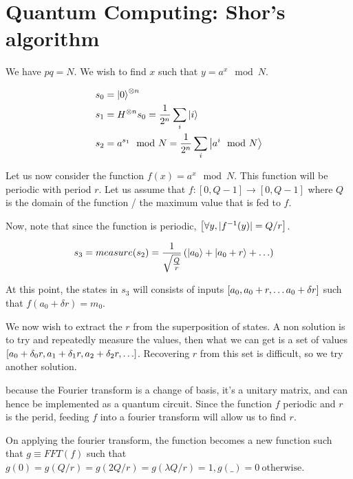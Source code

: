 \chapter{Quantum Computing: Shor's algorithm}

We have $pq = N$. We wish to find $x$ such that $y = a^x \mod N$.

\begin{align*}
    &s_0 = \ket 0^{\otimes n} \\
    &s_1 = H^{\otimes n} s_0  = \frac{1}{2^n} \sum_i \ket{i} \\
    &s_2 = a^{s_1} \mod N = \frac{1}{2^n} \sum_i \ket{a^i \mod N} \\
\end{align*}

Let us now consider the function $f(x) = a^x \mod N$. This function will
be periodic with period $r$. Let us assume that $f: [0, Q-1] \to [0, Q-1]$ where
$Q$ is the domain of the function / the maximum value that is fed to $f$.

Now, note that since the function is periodic, $\left[\forall y, |f^{-1}(y)| = Q/r\right]$.

\begin{align*}
    &s_3 = measure(s_2) = \frac{1}{\sqrt\frac{Q}{r}} \l(\ket{a_0} + \ket {a_0 + r} + \dots \r)
\end{align*}

At this point, the states in $s_3$ will consists of inputs $\left[ a_0, a_0 + r, \dots a_0 + \delta r \right]$
such that $f(a_0 + \delta r) = m_0$.

We now wish to extract the $r$ from the superposition of states. A non solution
is to try and repeatedly measure the values, then what we can get is a set of
values $\l[a_0 + \delta_0 r, a_1 + \delta_1 r, a_2 + \delta_2 r, \dots \r]$.
Recovering $r$ from this set is difficult, so we try another solution.

because the Fourier transform is a change of basis, it's a unitary matrix,
and can hence be implemented as a quantum circuit. Since the function $f$
periodic and $r$ is the perid, feeding $f$ into a fourier transform will
allow us to find $r$. 

On applying the fourier transform, the function becomes a new function
such that $g \equiv FFT(f)$ such that $g(0) = g(Q/r) = g(2Q/r) = g(\lambda Q/r) = 1, g(\_) = 0~\text{otherwise}$.

    
